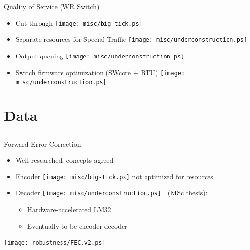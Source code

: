 \documentclass[compress,red]{beamer}
\begin{document}
\begin{frame}{Quality of Service (WR Switch)}

  \begin{itemize}
    \item Cut-through \texttt{[image: misc/big-tick.ps]}
    \item Separate resources for Special Traffic \texttt{[image: misc/underconstruction.ps]}
    \item Output queuing \texttt{[image: misc/underconstruction.ps]}
    \item Switch firmware optimization (SWcore + RTU) \texttt{[image: misc/underconstruction.ps]}
  \end{itemize}

\end{frame}

\section{Data}
\subsection{}
\begin{frame}{Forward Error Correction}

  \begin{itemize}
    \item Well-researched, concepts agreed
    \item Encoder \texttt{[image: misc/big-tick.ps]}  not optimized for resources
    \item Decoder \texttt{[image: misc/underconstruction.ps]}~~(MSc thesis):
    \begin{itemize}
      \item Hardware-accelerated LM32
      \item Eventually to be encoder-decoder
    \end{itemize}

  \end{itemize}

      \begin{center}
	\texttt{[image: robustness/FEC.v2.ps]}
      \end{center}  

\end{frame}
\end{document}
